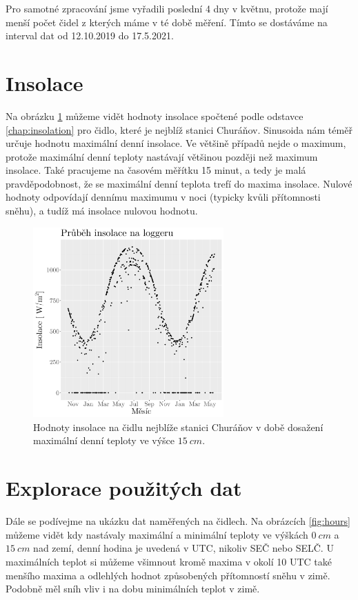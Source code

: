 Pro samotné zpracování jsme vyřadili poslední 4 dny v květnu, protože mají menší počet čidel z kterých máme v té době měření. Tímto se dostáváme na interval dat od 12.10.2019 do 17.5.2021.

\section{Insolace}
Na obrázku \ref{fig:insolacelogger} můžeme vidět hodnoty insolace spočtené podle odstavce \ref{chap:insolation} pro čidlo, které je nejblíž stanici Churáňov. Sinusoida nám téměř určuje hodnotu maximální denní insolace. Ve většině případů nejde o maximum, protože maximální denní teploty nastávají většinou později než maximum insolace. Také pracujeme na časovém měřítku 15 minut, a tedy je malá pravděpodobnost, že se maximální denní teplota trefí do maxima insolace. Nulové hodnoty odpovídají dennímu maximumu v noci (typicky kvůli přítomnosti sněhu), a tudíž má insolace nulovou hodnotu.

\begin{figure}
	\centering
	\includegraphics[width=0.65\textwidth]{img/ch2/insolation_max15cmNPS_4311_D_TMS.png}
	\caption{Hodnoty insolace na čidlu nejblíže stanici Churáňov v době dosažení maximální denní teploty ve výšce $\SI{15}{cm}$.}
	\label{fig:insolacelogger}
\end{figure}

\section{Explorace použitých dat}\label{chap:showingoffdata}
Dále se podívejme na ukázku dat naměřených na čidlech. Na obrázcích \ref{fig:hours} můžeme vidět kdy nastávaly maximální a minimální teploty ve výškách $\SI{0}{cm}$ a $\SI{15}{cm}$ nad zemí, denní hodina je uvedená v UTC, nikoliv SEČ nebo SELČ. U maximálních teplot si můžeme všimnout kromě maxima v okolí 10 UTC také menšího maxima a odlehlých hodnot způsobených přítomností sněhu v zimě. Podobně měl sníh vliv i na dobu minimálních teplot v zimě.

